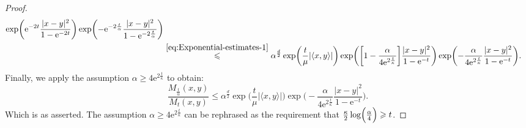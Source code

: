\documentclass[a4paper,oneside,10pt]{amsproc}
\theoremstyle{remark}
\newcommand{\la}{\langle}
\newcommand{\ra}{\rangle}
\renewcommand{\leq}{\leqslant}
\renewcommand{\leq}{\leqslant}
\renewcommand{\geq}{\geqslant}
\newcommand{\e}{\mathrm{e}} %
\renewcommand{\leq}{\leqslant}%
\renewcommand{\geq}{\geqslant}%
\begin{document}
\begin{proof}
\begin{align*}
    \exp\biggl(\e^{-2t} \frac{|x - y|^2}{1 - \e^{-2t}} \biggr)
    \exp\biggl(-\e^{-2\frac{t}{\alpha}} \frac{|x - y|^2}{1 -
      \e^{-2\frac{t}{\alpha}}}  \biggr)\\ 
    &\stackrel{\eqref{eq:Exponential-estimates-1}}{\leq} \alpha^{\frac{d}2} \exp\biggl (\frac{t}{\mu} |\la x, y \ra|
    \biggr) \exp \biggl (\biggl[1 -\frac{\alpha}{4\e^{2
        \frac{t}{\kappa}}} \biggr]  \frac{|x - y|^2}{1 - \e^{-t}}
    \biggr ) \exp \biggl (-\frac{\alpha}{4\e^{2 \frac{t}{\kappa}}} \frac{|x - y|^2}{1
      - \e^{-t}} \biggr). 
  \end{align*}
  Finally, we apply the assumption $\alpha \geq 4 \e^{2
    \frac{t}{\kappa}}$ to obtain: 
  \begin{equation*}
    \frac{M_{\frac{t}{\alpha}}(x, y)}{M_t(x, y)} \leq \alpha^{\frac{d}2}
   \exp\biggl (\frac{t}{\mu} |\la x, y \ra| \biggr)
   \exp\biggl(-\frac{\alpha}{4\e^{2 \frac{t}{\kappa}}} \frac{|x - y|^2}{1 - \e^{-t}}
   \biggr). 
 \end{equation*}
  Which is as asserted. The assumption $\alpha \geq 4 \e^{2
    \frac{t}{\kappa}}$ can be rephrased as the requirement that
  $\frac{\kappa}2 \log\Bigl( \frac\alpha4 \Bigr) \geq t$.
\end{proof}
\end{document}
